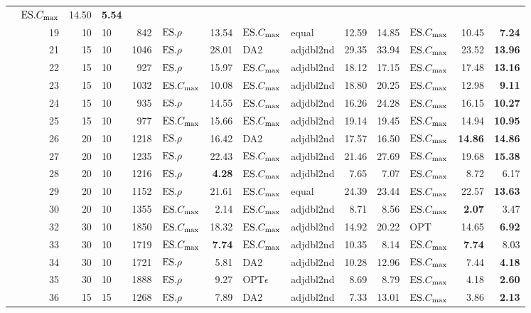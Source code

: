 {\begin{longtable}{l@{}rr@{$\times$}lr|lr|llr|r|lr|r}
& $\text{ES}.{C_{\max}}$ & 14.50 & \textbf{5.54} \\ 
&19 & 10&10 & 842 & $\text{ES}.{\rho}$ & 13.54 & $\text{ES}.{C_{\max}}$ & equal & 12.59 & 14.85 & 
$\text{ES}.{C_{\max}}$ & 10.45 & \textbf{7.24} \\ 
&21 & 15&10 & 1046 & $\text{ES}.{\rho}$ & 28.01 & DA2 & adjdbl2nd & 29.35 & 
33.94 & $\text{ES}.{C_{\max}}$ & 23.52 & \textbf{13.96} \\ 
&22 & 15&10 & 927 & $\text{ES}.{\rho}$ & 15.97 & $\text{ES}.{C_{\max}}$ & adjdbl2nd & 18.12 & 17.15 
& $\text{ES}.{C_{\max}}$ & 17.48 & \textbf{13.16} \\ 
&23 & 15&10 & 1032 & $\text{ES}.{C_{\max}}$ & 10.08 & $\text{ES}.{C_{\max}}$ & adjdbl2nd & 18.80 & 
20.25 
& $\text{ES}.{C_{\max}}$ & 12.98 & \textbf{9.11} \\ 
&24 & 15&10 & 935 & $\text{ES}.{\rho}$ & 14.55 & $\text{ES}.{C_{\max}}$ & adjdbl2nd & 16.26 & 24.28 
& $\text{ES}.{C_{\max}}$ & 16.15 & \textbf{10.27} \\ 
&25 & 15&10 & 977 & $\text{ES}.{C_{\max}}$ & 15.66 & $\text{ES}.{C_{\max}}$ & adjdbl2nd & 19.14 & 19.45 
& $\text{ES}.{C_{\max}}$ & 14.94 & \textbf{10.95} \\ 
&26 & 20&10 & 1218 & $\text{ES}.{\rho}$ & 16.42 & DA2 & adjdbl2nd & 17.57 & 16.50 
& $\text{ES}.{C_{\max}}$ & \textbf{14.86} & \textbf{14.86} \\ 
&27 & 20&10 & 1235 & $\text{ES}.{\rho}$ & 22.43 & $\text{ES}.{C_{\max}}$ & adjdbl2nd & 21.46 & 27.69 
& $\text{ES}.{C_{\max}}$ & 19.68 & \textbf{15.38} \\ 
&28 & 20&10 & 1216 & $\text{ES}.{\rho}$ & \textbf{4.28} & $\text{ES}.{C_{\max}}$ & adjdbl2nd & 7.65 
& 7.07 & $\text{ES}.{C_{\max}}$ & 8.72 & 6.17 \\ 
&29 & 20&10 & 1152 & $\text{ES}.{\rho}$ & 21.61 & $\text{ES}.{C_{\max}}$ & equal & 24.39 & 23.44 & 
$\text{ES}.{C_{\max}}$ & 22.57 & \textbf{13.63} \\ 
&30 & 20&10 & 1355 & $\text{ES}.{C_{\max}}$ & 2.14 & $\text{ES}.{C_{\max}}$ & adjdbl2nd & 8.71 & 8.56 & 
$\text{ES}.{C_{\max}}$ & \textbf{2.07} & 3.47 \\ 
&32 & 30&10 & 1850 & $\text{ES}.{C_{\max}}$ & 18.32 & $\text{ES}.{C_{\max}}$ & adjdbl2nd & 14.92 & 
20.22 & OPT & 14.65 & \textbf{6.92} \\ 
&33 & 30&10 & 1719 & $\text{ES}.{C_{\max}}$ & \textbf{7.74} & $\text{ES}.{C_{\max}}$ & adjdbl2nd & 
10.35 & 8.14 & $\text{ES}.{C_{\max}}$ & \textbf{7.74} & 8.03 \\ 
&34 & 30&10 & 1721 & $\text{ES}.{\rho}$ & 5.81 & DA2 & adjdbl2nd & 10.28 & 12.96 
& $\text{ES}.{C_{\max}}$ & 7.44 & \textbf{4.18} \\ 
&35 & 30&10 & 1888 & $\text{ES}.{\rho}$ & 9.27 & OPT$\epsilon$ & adjdbl2nd & 8.69 & 8.79 
& $\text{ES}.{C_{\max}}$ & 4.18 & \textbf{2.60} \\ 
&36 & 15&15 & 1268 & $\text{ES}.{\rho}$ & 7.89 & DA2 & adjdbl2nd & 7.33 & 13.01 
& $\text{ES}.{C_{\max}}$ & 3.86 & \textbf{2.13} \\ 

\end{longtable}}
